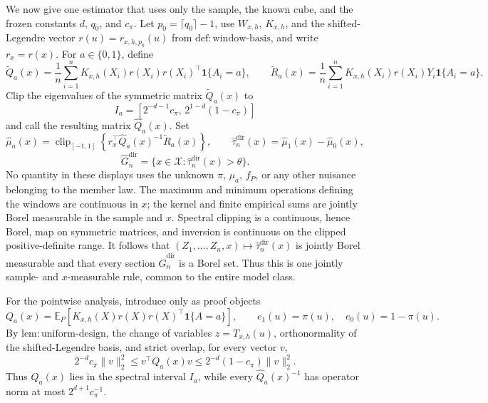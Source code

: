 We now give one estimator that uses only the sample, the known cube, and the frozen constants \(d\), \(q_0\), and \(c_\pi\). Let \(p_0=\lceil q_0\rceil-1\), use \(W_{x,h}\), \(K_{x,h}\), and the shifted-Legendre vector \(r(u)=r_{x,h,p_0}(u)\) from \(\mathrm{def:window\text{-}basis}\), and write \(r_x=r(x)\). For \(a\in\{0,1\}\), define
\[
\widetilde Q_a(x)=\frac1n\sum_{i=1}^nK_{x,h}(X_i)r(X_i)r(X_i)^\top\mathbf 1\{A_i=a\},
\qquad
\widetilde R_a(x)=\frac1n\sum_{i=1}^nK_{x,h}(X_i)r(X_i)Y_i\mathbf 1\{A_i=a\}.
\]
Clip the eigenvalues of the symmetric matrix \(\widetilde Q_a(x)\) to
\[
I_a=[2^{-d-1}c_\pi,\,2^{1-d}(1-c_\pi)]
\]
and call the resulting matrix \(\widehat Q_a(x)\). Set
\[
\widehat\mu_a(x)=\operatorname{clip}_{[-1,1]}\!\left\{r_x^\top\widehat Q_a(x)^{-1}\widetilde R_a(x)\right\},
\qquad
\widehat\tau_n^{\mathrm{dir}}(x)=\widehat\mu_1(x)-\widehat\mu_0(x),
\]
\[
\widehat G_n^{\mathrm{dir}}=\{x\in\mathcal X:\widehat\tau_n^{\mathrm{dir}}(x)>\theta\}.
\]
No quantity in these displays uses the unknown \(\pi\), \(\mu_a\), \(f_P\), or any other nuisance belonging to the member law. The maximum and minimum operations defining the windows are continuous in \(x\); the kernel and finite empirical sums are jointly Borel measurable in the sample and \(x\). Spectral clipping is a continuous, hence Borel, map on symmetric matrices, and inversion is continuous on the clipped positive-definite range. It follows that \((Z_1,\ldots,Z_n,x)\mapsto\widehat\tau_n^{\mathrm{dir}}(x)\) is jointly Borel measurable and that every section \(\widehat G_n^{\mathrm{dir}}\) is a Borel set. Thus this is one jointly sample- and \(x\)-measurable rule, common to the entire model class.

For the pointwise analysis, introduce only as proof objects
\[
Q_a(x)=\mathbb E_P\!\left[K_{x,h}(X)r(X)r(X)^\top\mathbf 1\{A=a\}\right],
\qquad e_1(u)=\pi(u),\quad e_0(u)=1-\pi(u).
\]
By \(\mathrm{lem:uniform\text{-}design}\), the change of variables \(z=T_{x,h}(u)\), orthonormality of the shifted-Legendre basis, and strict overlap, for every vector \(v\),
\[
2^{-d}c_\pi\|v\|_2^2
\le v^\top Q_a(x)v
\le2^{-d}(1-c_\pi)\|v\|_2^2.
\]
Thus \(Q_a(x)\) lies in the spectral interval \(I_a\), while every \(\widehat Q_a(x)^{-1}\) has operator norm at most \(2^{d+1}c_\pi^{-1}\).

